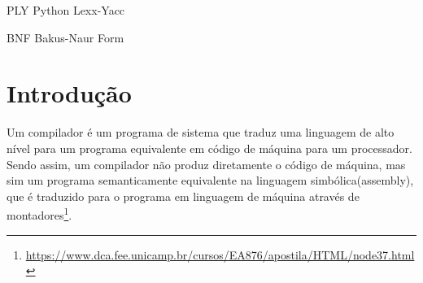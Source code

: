 \documentclass[
	12pt,				%
	openright,			%
	twoside,			%
	a4paper,			%
	english,			%
	french,				%
	spanish,			%
	brazil				%
	]{abntex2}
\begin{document}
\frenchspacing 


\imprimircapa

\imprimirfolhaderosto*


%
%     

\begin{siglas}
  \item[PLY] Python Lexx-Yacc
  \item[BNF] Bakus-Naur Form
\end{siglas}

\tableofcontents*
\cleardoublepage



\textual

\chapter*[Introdução]{Introdução}

Um compilador é um programa de sistema que traduz uma linguagem de alto nível
para um programa equivalente em código de máquina para um processador. Sendo assim,
um compilador não produz diretamente o código de máquina, mas sim um programa
semanticamente equivalente na linguagem simbólica(assembly), que é traduzido para o programa em linguagem de máquina através de montadores\footnote{\url{https://www.dca.fee.unicamp.br/cursos/EA876/apostila/HTML/node37.html}}.
\end{document}
